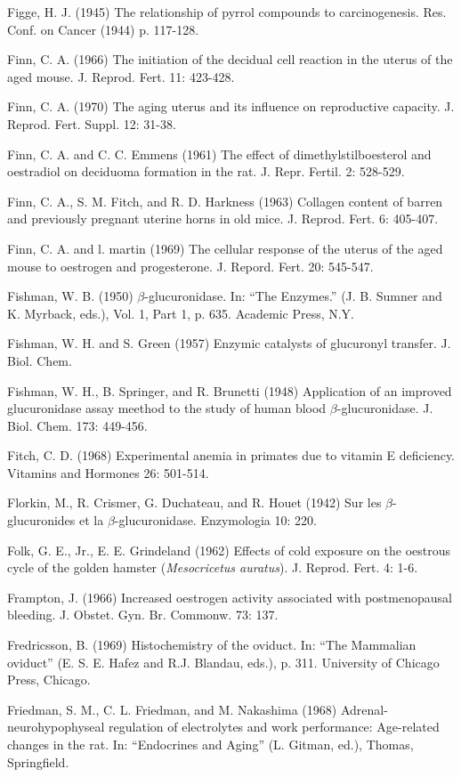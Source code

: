 Figge, H. J. (1945) The relationship of pyrrol compounds to carcinogenesis. Res. Conf. on Cancer (1944) p. 117-128.

Finn, C. A. (1966) The initiation of the decidual cell reaction in the uterus of the aged mouse. J. Reprod. Fert. 11: 423-428.

Finn, C. A. (1970) The aging uterus and its influence on reproductive capacity. J. Reprod. Fert. Suppl. 12: 31-38.

Finn, C. A. and C. C. Emmens (1961) The effect of dimethylstilboesterol and oestradiol on deciduoma formation in the rat. J. Repr. Fertil. 2: 528-529.

Finn, C. A., S. M. Fitch, and R. D. Harkness (1963) Collagen content of barren and previously pregnant uterine horns in old mice. J. Reprod. Fert. 6: 405-407.


Finn, C. A. and l. martin (1969) The cellular response of the uterus of the aged mouse to oestrogen and progesterone. J. Repord. Fert. 20: 545-547.

Fishman, W. B. (1950) $\beta$-glucuronidase. In: ``The Enzymes.'' (J. B. Sumner and K. Myrback, eds.), Vol. 1, Part 1, p. 635. Academic Press, N.Y.

Fishman, W. H. and S. Green (1957) Enzymic catalysts of glucuronyl transfer. J. Biol. Chem.

Fishman, W. H., B. Springer, and R. Brunetti (1948) Application of an improved glucuronidase assay meethod to the study of human blood $\beta$-glucuronidase. J. Biol. Chem. 173: 449-456.

Fitch, C. D. (1968) Experimental anemia in primates due to vitamin E deficiency. Vitamins and Hormones 26: 501-514.

Florkin, M., R. Crismer, G. Duchateau, and R. Houet (1942) Sur les $\beta$-glucuronides et la $\beta$-glucuronidase. Enzymologia 10: 220.

Folk, G. E., Jr., E. E. Grindeland (1962) Effects of cold exposure on the oestrous cycle of the golden hamster (\textit{Mesocricetus auratus}). J. Reprod. Fert. 4: 1-6.

Frampton, J. (1966) Increased oestrogen activity associated with postmenopausal bleeding. J. Obstet. Gyn. Br. Commonw. 73: 137.

Fredricsson, B. (1969) Histochemistry of the oviduct. In: ``The Mammalian oviduct'' (E. S. E. Hafez and R.J. Blandau, eds.), p. 311. University of Chicago Press, Chicago.

Friedman, S. M., C. L. Friedman, and M. Nakashima (1968) Adrenal-neurohypophyseal regulation of electrolytes and work performance: Age-related changes in the rat. In: ``Endocrines and Aging'' (L. Gitman, ed.), Thomas, Springfield.

